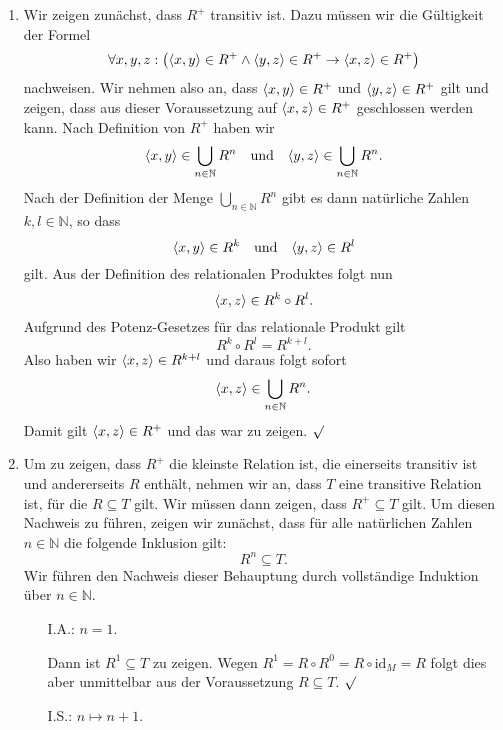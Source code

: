 \begin{enumerate}
\item Wir zeigen zun\"{a}chst, dass $R^+$ transitiv ist. Dazu m\"{u}ssen wir die G\"{u}ltigkeit der Formel
      \[ \forall x, y, z: \bigl(\pair(x,y) \in R^+ \wedge \pair(y,z) \in R^+ \rightarrow \pair(x,z) \in R^+\bigr) \]
nachweisen.  Wir nehmen also an, dass $\pair(x,y) \in R^+$ und $\pair(y,z) \in R^+$
gilt und zeigen, dass aus dieser Voraussetzung auf $\pair(x,z) \in R^+$ geschlossen
werden kann.  Nach Definition von $R^+$ haben wir 
\[ \pair(x,y) \in \bigcup\limits_{n\in\mathbb{N}} R^n \quad \mbox{und} \quad
   \pair(y,z) \in \bigcup\limits_{n\in\mathbb{N}} R^n.
\]
Nach der Definition der Menge $\bigcup\limits_{n\in\mathbb{N}} R^n$ gibt es dann nat\"{u}rliche Zahlen $k,l\in\mathbb{N}$, so dass
\[ \pair(x,y) \in R^k \quad \mbox{und} \quad \pair(y,z) \in R^l \]
gilt.  Aus der Definition des relationalen Produktes folgt nun
\[  \pair(x,z) \in R^k \circ R^l. \]
Aufgrund des Potenz-Gesetzes f\"{u}r das relationale Produkt gilt 
\[ R^k \circ R^l = R^{k+l}. \]
Also haben wir $\pair(x,z) \in R^{k+l}$ und daraus folgt sofort
\[  \pair(x,z) \in \bigcup\limits_{n\in\mathbb{N}} R^n. \]
Damit gilt $\pair(x,z) \in R^+$ und das war zu zeigen. $\surd$

\item 
Um zu zeigen, dass $R^+$ die kleinste Relation ist, die einerseits transitiv ist
und andererseits $R$ enth\"{a}lt, nehmen wir an, dass $T$ eine transitive Relation ist,
f\"{u}r die $R \subseteq T$ gilt.  Wir m\"{u}ssen dann zeigen, dass $R^+ \subseteq T$ gilt.  Um diesen
Nachweis zu f\"{u}hren, zeigen wir zun\"{a}chst, dass f\"{u}r alle 
nat\"{u}rlichen Zahlen $n\in\mathbb{N}$ die folgende Inklusion gilt:
\[ R^n \subseteq T. \]
Wir f\"{u}hren den Nachweis dieser Behauptung durch vollst\"{a}ndige Induktion \"{u}ber $n\in\mathbb{N}$.
\begin{enumerate}
\item[I.A.:] $n=1$.  

               Dann ist $R^1 \subseteq T$ zu zeigen.  Wegen
               $R^1 = R \circ R^0 = R \circ \mathrm{id}_M = R$
               folgt dies aber unmittelbar aus der Voraussetzung $R \subseteq T$. $\surd$
\item[I.S.:] $n \mapsto n+1$.  


\end{enumerate}
\end{enumerate}
